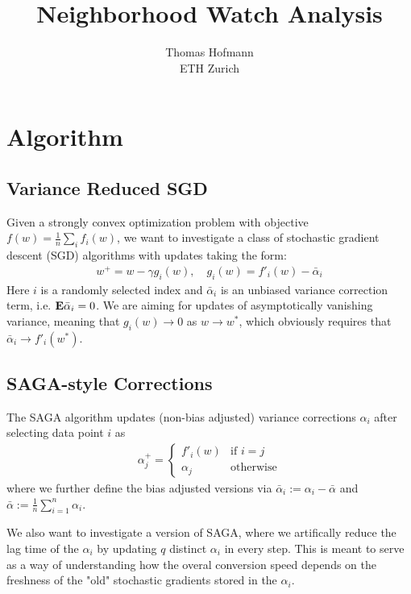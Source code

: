 \documentclass{article}
\title{Neighborhood Watch Analysis}
\author{Thomas Hofmann\\ ETH Zurich}
\newcommand{\E}{{\bf E}}
\begin{document}
\maketitle

\section{Algorithm}

\subsection{Variance Reduced SGD}

Given a strongly convex optimization problem with objective $f(w) = \frac 1n \sum_i f_i(w)$, we want to investigate a class of stochastic gradient descent (SGD) algorithms with updates taking the  form:
\begin{align}
w^+ = w - \gamma g_i(w),  \quad g_i(w)=  f'_i(w) - \bar \alpha_i 
\end{align}
Here  $i$ is a randomly selected index and $\bar\alpha_i$ is an unbiased variance correction term, i.e. $\E \bar\alpha_i = 0$. We are aiming for updates of asymptotically vanishing variance, meaning that $g_i(w) \to 0$ as $w \to w^*$, which obviously requires that $\bar\alpha_i \to f'_i(w^*)$.

\subsection{SAGA-style Corrections}

The SAGA algorithm  updates (non-bias adjusted) variance corrections $\alpha_i$ after selecting data point $i$ as 
\begin{align}
\alpha^+_j  = 
\begin{cases}
f'_i(w) & \text{if $i=j$} \\
\alpha_j & \text{otherwise}
\end{cases}
\end{align} 
where we further define the bias adjusted versions via $\bar\alpha_i := \alpha_i - \bar \alpha$ and $\bar \alpha := \frac 1n \sum_{i=1}^n  \alpha_i$. 

We also want to investigate a version of SAGA, where we artifically reduce the lag time of the $\alpha_i$ by updating $q$ distinct $\alpha_i$ in every step. This is meant to serve as a way of understanding how the overal conversion speed depends on the freshness of the "old" stochastic gradients stored in the $\alpha_i$.   
\end{document}
